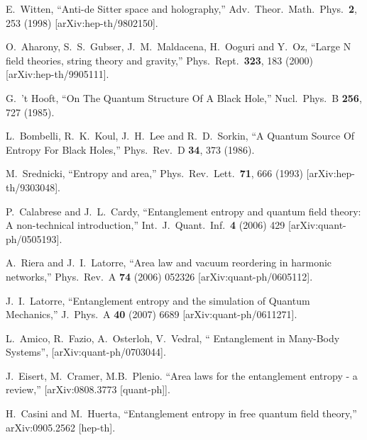 \documentclass[12pt]{article}
\begin{document}
\begin{thebibliography}{99}
E.~Witten,
  ``Anti-de Sitter space and holography,''
  Adv.\ Theor.\ Math.\ Phys.\  {\bf 2}, 253 (1998)
  [arXiv:hep-th/9802150].


O.~Aharony, S.~S.~Gubser, J.~M.~Maldacena, H.~Ooguri and Y.~Oz,
  ``Large N field theories, string theory and gravity,''
  Phys.\ Rept.\  {\bf 323}, 183 (2000)
  [arXiv:hep-th/9905111].



G.~'t Hooft,
  ``On The Quantum Structure Of A Black Hole,''
  Nucl.\ Phys.\ B {\bf 256}, 727 (1985).



L.~Bombelli, R.~K.~Koul, J.~H.~Lee and R.~D.~Sorkin,
  ``A Quantum Source Of Entropy For Black Holes,''
  Phys.\ Rev.\ D {\bf 34}, 373 (1986).

 M.~Srednicki,
  ``Entropy and area,''
  Phys.\ Rev.\ Lett.\  {\bf 71}, 666 (1993)
  [arXiv:hep-th/9303048].


  P.~Calabrese and J.~L.~Cardy,
  ``Entanglement entropy and quantum field theory: A non-technical
  introduction,''
  Int.\ J.\ Quant.\ Inf.\  {\bf 4} (2006) 429
  [arXiv:quant-ph/0505193].


  A.~Riera and J.~I.~Latorre,
  ``Area law and vacuum reordering in harmonic networks,''
  Phys.\ Rev.\  A {\bf 74} (2006) 052326
  [arXiv:quant-ph/0605112].

  J.~I.~Latorre,
  ``Entanglement entropy and the simulation of Quantum Mechanics,''
  J.\ Phys.\ A  {\bf 40} (2007) 6689
  [arXiv:quant-ph/0611271].

 L.~Amico, R.~Fazio, A.~Osterloh, V.~Vedral,
`` Entanglement in Many-Body Systems'',
 [arXiv:quant-ph/0703044].

 J.~Eisert, M.~Cramer, M.B.~Plenio.
 ``Area laws for the entanglement entropy - a review,''
 [arXiv:0808.3773 [quant-ph]].


  H.~Casini and M.~Huerta,
  ``Entanglement entropy in free quantum field theory,''
  arXiv:0905.2562 [hep-th].


\end{thebibliography}
\end{document}
